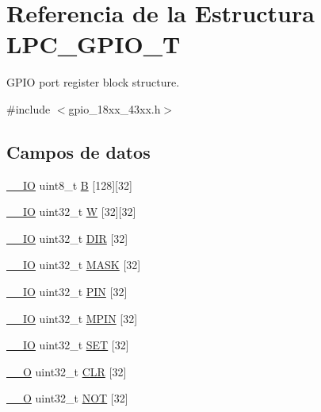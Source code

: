 \hypertarget{struct_l_p_c___g_p_i_o___t}{}\section{Referencia de la Estructura L\+P\+C\+\_\+\+G\+P\+I\+O\+\_\+T}
\label{struct_l_p_c___g_p_i_o___t}


G\+P\+IO port register block structure.  




{\ttfamily \#include $<$gpio\+\_\+18xx\+\_\+43xx.\+h$>$}

\subsection*{Campos de datos}
\begin{DoxyCompactItemize}
\item 
\hyperlink{core__sc300_8h_aec43007d9998a0a0e01faede4133d6be}{\+\_\+\+\_\+\+IO} uint8\+\_\+t \hyperlink{struct_l_p_c___g_p_i_o___t_a057fd7b1589f98e60362632f4bcd1459}{B} \mbox{[}128\mbox{]}\mbox{[}32\mbox{]}
\item 
\hyperlink{core__sc300_8h_aec43007d9998a0a0e01faede4133d6be}{\+\_\+\+\_\+\+IO} uint32\+\_\+t \hyperlink{struct_l_p_c___g_p_i_o___t_a0aff9ee23a7a7a7b2fe413d40594b0fe}{W} \mbox{[}32\mbox{]}\mbox{[}32\mbox{]}
\item 
\hyperlink{core__sc300_8h_aec43007d9998a0a0e01faede4133d6be}{\+\_\+\+\_\+\+IO} uint32\+\_\+t \hyperlink{struct_l_p_c___g_p_i_o___t_a63f44c6126fd4e7a5670a59adb4483dd}{D\+IR} \mbox{[}32\mbox{]}
\item 
\hyperlink{core__sc300_8h_aec43007d9998a0a0e01faede4133d6be}{\+\_\+\+\_\+\+IO} uint32\+\_\+t \hyperlink{struct_l_p_c___g_p_i_o___t_a037eda1f7d90b5c572f8d993da5ee8c2}{M\+A\+SK} \mbox{[}32\mbox{]}
\item 
\hyperlink{core__sc300_8h_aec43007d9998a0a0e01faede4133d6be}{\+\_\+\+\_\+\+IO} uint32\+\_\+t \hyperlink{struct_l_p_c___g_p_i_o___t_a2a7d9cae51250ad1c8b30cdb35f649ea}{P\+IN} \mbox{[}32\mbox{]}
\item 
\hyperlink{core__sc300_8h_aec43007d9998a0a0e01faede4133d6be}{\+\_\+\+\_\+\+IO} uint32\+\_\+t \hyperlink{struct_l_p_c___g_p_i_o___t_aa7ddc0fe8597d34934321eafb130a946}{M\+P\+IN} \mbox{[}32\mbox{]}
\item 
\hyperlink{core__sc300_8h_aec43007d9998a0a0e01faede4133d6be}{\+\_\+\+\_\+\+IO} uint32\+\_\+t \hyperlink{struct_l_p_c___g_p_i_o___t_ada8d0d4ba2aa74d866a4c54da9c9fc49}{S\+ET} \mbox{[}32\mbox{]}
\item 
\hyperlink{core__sc300_8h_a7e25d9380f9ef903923964322e71f2f6}{\+\_\+\+\_\+O} uint32\+\_\+t \hyperlink{struct_l_p_c___g_p_i_o___t_a27030dab6a2024193f0c12b347eaa255}{C\+LR} \mbox{[}32\mbox{]}
\item 
\hyperlink{core__sc300_8h_a7e25d9380f9ef903923964322e71f2f6}{\+\_\+\+\_\+O} uint32\+\_\+t \hyperlink{struct_l_p_c___g_p_i_o___t_a9aa40dfddcb9ac35511ef18d693953af}{N\+OT} \mbox{[}32\mbox{]}
\end{DoxyCompactItemize}



